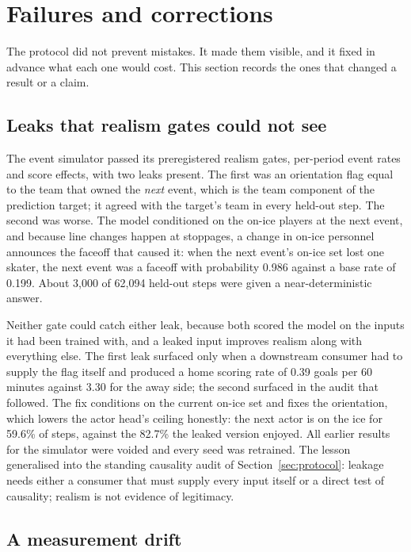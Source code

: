\section{Failures and corrections}
\label{sec:failures}

The protocol did not prevent mistakes. It made them visible, and it fixed in
advance what each one would cost. This section records the ones that changed
a result or a claim.

\subsection{Leaks that realism gates could not see}

The event simulator passed its preregistered realism gates, per-period event
rates and score effects, with two leaks present. The first was an orientation
flag equal to the team that owned the \emph{next} event, which is the team
component of the prediction target; it agreed with the target's team in every
held-out step. The second was worse. The model conditioned on the on-ice
players at the next event, and because line changes happen at stoppages, a
change in on-ice personnel announces the faceoff that caused it: when the
next event's on-ice set lost one skater, the next event was a faceoff with
probability 0.986 against a base rate of 0.199. About 3,000 of 62,094 held-out
steps were given a near-deterministic answer.

Neither gate could catch either leak, because both scored the model on the
inputs it had been trained with, and a leaked input improves realism along
with everything else. The first leak surfaced only when a downstream consumer
had to supply the flag itself and produced a home scoring rate of 0.39 goals
per 60 minutes against 3.30 for the away side; the second surfaced in the audit
that followed. The fix conditions on the current on-ice set and fixes the
orientation, which lowers the actor head's ceiling honestly: the next actor is
on the ice for 59.6\% of steps, against the 82.7\% the leaked version enjoyed.
All earlier results for the simulator were voided and every seed was
retrained. The lesson generalised into the standing causality audit of
Section~\ref{sec:protocol}: leakage needs either a consumer that must supply
every input itself or a direct test of causality; realism is not evidence of
legitimacy.

\subsection{A measurement drift}

